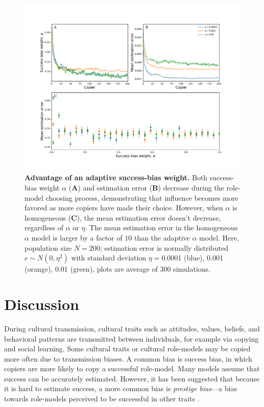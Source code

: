 \documentclass[12pt]{extarticle}
\begin{document}
\begin{figure}[h]
    \includegraphics[width=\linewidth]{../figures/final/choose_bias.pdf}
  \caption{
  \textbf{Advantage of an adaptive success-bias weight.}
  Both success-bias weight $\alpha$ (\textbf{A}) and estimation error (\textbf{B}) decrease during the role-model choosing process, demonstrating that influence becomes more favored as more copiers have made their choice.
However, when $\alpha$ is homogeneous (\textbf{C}), the mean estimation error doesn't decrease, regardless of $\alpha$ or $\eta$.
The mean estimation error in the homogeneous $\alpha$ model is larger by a factor of $10$ than the adaptive $\alpha$ model.
Here, population size $N=200$; estimation error is normally distributed $e \sim N(0,\eta^2)$ with standard deviation $\eta=$0.0001 (blue), 0.001 (orange), 0.01 (green), plots are average of $300$ simulations.}	
  \label{fig:influence_advantage}
\end{figure}




\section*{Discussion}
During cultural transmission, cultural traits such as attitudes, values, beliefs, and behavioral patterns are transmitted between individuals, for example via copying and social learning.
Some cultural traits or cultural role-models may be copied more often due to transmission biases. 
A common bias is success bias, in which copiers are more likely to copy a successful role-model. Many models assume that success can be accurately estimated.
However, it has been suggested that because it is hard to estimate success, a more common bias is \emph{prestige bias}---a bias towards role-models perceived to be successful in other traits \citep{fijian_social_bias}.
\end{document}
